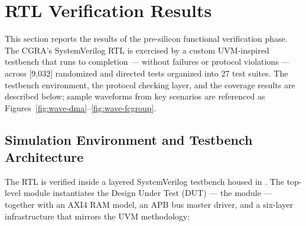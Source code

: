 
\setcounter{section}{0}
\setcounter{figure}{0}
\setcounter{table}{0}
\setcounter{lstlisting}{0}

\section{RTL Verification Results}
\label{sec:ch5-rtl}

This section reports the results of the pre-silicon functional
verification phase. The CGRA's SystemVerilog RTL is exercised by a
custom UVM-inspired testbench that runs to completion --- without
failures or protocol violations --- across [9{,}032] randomized and
directed tests organized into 27 test suites. The testbench
environment, the protocol checking layer, and the coverage results
are described below; sample waveforms from key scenarios are
referenced as Figures~\ref{fig:wave-dma}--\ref{fig:wave-fcgroup}.

\subsection{Simulation Environment and Testbench Architecture}
\label{ssec:tb-env}

\begin{sloppypar}
The RTL is verified inside a layered SystemVerilog testbench housed
in . The top-level module 
instantiates the Design Under Test (DUT) --- the 
module --- together with an AXI4 RAM model, an APB bus master
driver, and a six-layer infrastructure that mirrors the UVM
methodology:
\end{sloppypar}

